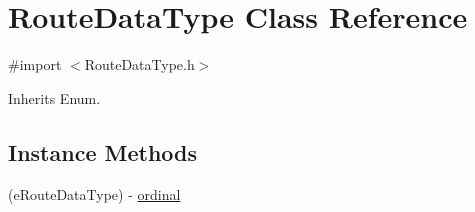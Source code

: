 \hypertarget{interface_route_data_type}{}\section{Route\+Data\+Type Class Reference}
\label{interface_route_data_type}


{\ttfamily \#import $<$Route\+Data\+Type.\+h$>$}



Inherits Enum.

\subsection*{Instance Methods}
\begin{DoxyCompactItemize}
\item 
(e\+Route\+Data\+Type) -\/ \hyperlink{interface_route_data_type_adaa40ca2b35c77c8f214743c13b1b7a9}{ordinal}
\end{DoxyCompactItemize}
